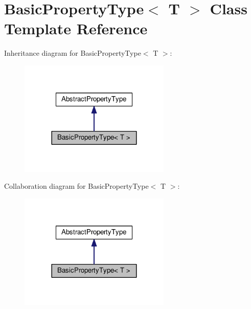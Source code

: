 \hypertarget{classBasicPropertyType}{\section{Basic\+Property\+Type$<$ T $>$ Class Template Reference}
\label{classBasicPropertyType}
}


Inheritance diagram for Basic\+Property\+Type$<$ T $>$\+:\nopagebreak
\begin{figure}[H]
\begin{center}
\leavevmode
\includegraphics[width=204pt]{classBasicPropertyType__inherit__graph}
\end{center}
\end{figure}


Collaboration diagram for Basic\+Property\+Type$<$ T $>$\+:\nopagebreak
\begin{figure}[H]
\begin{center}
\leavevmode
\includegraphics[width=204pt]{classBasicPropertyType__coll__graph}
\end{center}
\end{figure}
